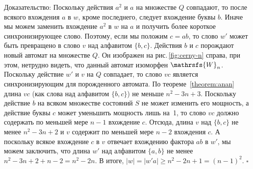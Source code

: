 \documentclass[11pt]{article}
\newcommand{\sw}{reset word}
\newenvironment{proof}{Доказательство:}{$\square$}
\begin{document}
\begin{proof}
Поскольку действия $a^2$ и $a$ на множестве $Q$ совпадают, то после
всякого вхождения $a$ в $w$, кроме последнего, следует вхождение 
буквы $b$. Иначе мы можем заменить вхождение $a^2$ в $w$ на $a$
и получить более короткое синхронизирующее слово. Поэтому, если мы положим
$c=ab$, то слово $w'$ может быть превращено в слово $v$ над алфавитом $\{b,c\}$. 
Действия $b$ и $c$ порождают новый автомат на множестве $Q$. Он изображен
на рис.\,\ref{fig:cerny-n} справа, при этом, нетрудно видеть, что данный автомат
изоморфен $\mathrsfs{W}_n$. Поскольку действие $w'$ и $v$ на $Q$ совпадает, то
слово $vc$ является синхронизирующим для порожденного автомата. 
По теореме~\ref{theorem:anan} длина $vc$ (как слова над алфавитом $\{b,c\}$) 
не меньше $n^2-3n+3$. Поскольку действие $b$ на всяком множестве состояний $S$
не может изменить его мощность, а действие буквы $c$ может уменьшить мощность лишь на~1,
то слово $vc$ должно содержать по меньшей мере $n-1$ вхождение $c$. Отсюда,
длина $v$ над $\{b,c\}$ не менее $n^2-3n+2$ и $v$ содержит по меньшей мере $n-2$ 
вхождения $c$. А поскольку всякое вхождение $c$ в $v$ отвечает вхождению фактора $ab$ в $w'$, 
мы можем заключить, что длина $w'$ над алфавитом $\{a,b\}$ не менее $n^2-3n+2+n-2=n^2-2n$.
В итоге, $|w|=|w'a|\ge n^2-2n+1=(n-1)^2$.
\end{proof}
\end{document}
